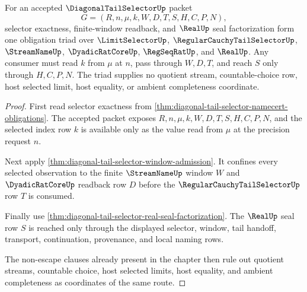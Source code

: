 \begin{theorem}
\label{thm:diagonal-tail-selector-obligation-triad}
For an accepted $\DiagonalTailSelectorUp$ packet
$$
G=(R,n,\mu,k,W,D,T,S,H,C,P,N),
$$
selector exactness, finite-window readback, and $\RealUp$ seal factorization form one obligation triad over $\LimitSelectorUp$, $\RegularCauchyTailSelectorUp$, $\StreamNameUp$, $\DyadicRatCoreUp$, $\RegSeqRatUp$, and $\RealUp$. Any consumer must read $k$ from $\mu$ at $n$, pass through $W,D,T$, and reach $S$ only through $H,C,P,N$. The triad supplies no quotient stream, countable-choice row, host selected limit, host equality, or ambient completeness coordinate.
\end{theorem}
\begin{proof}
First read selector exactness from \autoref{thm:diagonal-tail-selector-namecert-obligations}. The accepted packet exposes $R,n,\mu,k,W,D,T,S,H,C,P,N$, and the selected index row $k$ is available only as the value read from $\mu$ at the precision request $n$.

Next apply \autoref{thm:diagonal-tail-selector-window-admission}. It confines every selected observation to the finite $\StreamNameUp$ window $W$ and $\DyadicRatCoreUp$ readback row $D$ before the $\RegularCauchyTailSelectorUp$ row $T$ is consumed.

Finally use \autoref{thm:diagonal-tail-selector-real-seal-factorization}. The $\RealUp$ seal row $S$ is reached only through the displayed selector, window, tail handoff, transport, continuation, provenance, and local naming rows.

The non-escape clauses already present in the chapter then rule out quotient streams, countable choice, host selected limits, host equality, and ambient completeness as coordinates of the same route.
\end{proof}

